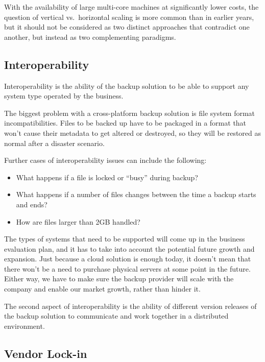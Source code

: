 With the availability of large multi-core machines at significantly
lower costs, the question of vertical vs.\ horizontal scaling is more
common than in earlier years, but it should not be considered as two
distinct approaches that contradict one another, but instead as two
complementing paradigms.



\subsection{Interoperability}

Interoperability is the ability of the backup solution to be able to
support any system type operated by the business. 

The biggest problem with a cross-platform backup solution is file system
format incompatibilities. Files to be backed up have to be packaged in a
format that won't cause their metadata to get altered or destroyed, so
they will be restored as normal after a disaster scenario. 

Further cases of interoperability issues can include the following:
\begin{itemize}
    \item What happens if a file is locked or “busy” during backup?
    \item What happens if a number of files changes between the time a backup starts and ends?
    \item How are files larger than 2GB handled?
\end{itemize}

The types of systems that need to be supported will come up in the
business evaluation plan, and it has to take into account the potential
future growth and expansion. Just because a cloud solution is enough
today, it doesn't mean that there won't be a need to purchase physical
servers at some point in the future. Either way, we have to make sure
the backup provider will scale with the company and enable our market
growth, rather than hinder it.

The second aspect of interoperability is the ability of different
version releases of the backup solution to communicate and work together
in a distributed environment.

\subsection{Vendor Lock-in}

